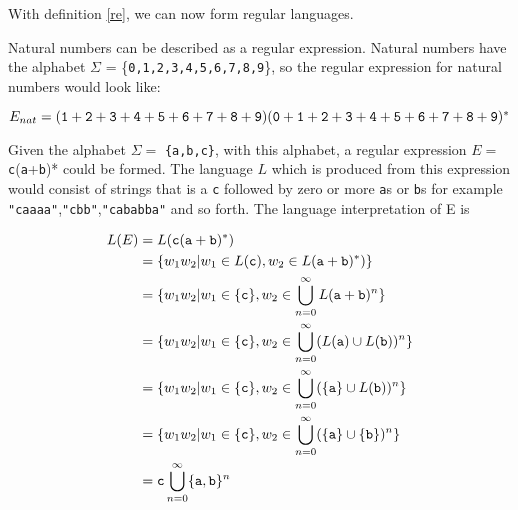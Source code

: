 With definition \ref{re}, we can now form regular languages. 
\begin{myex}Natural numbers can be described as a regular expression. Natural numbers have the alphabet $\Sigma$ = \{{\tt 0,1,2,3,4,5,6,7,8,9}\}, so the regular expression for natural numbers would look like:
\begin{center}
$E_{nat} = ({\tt 1}+{\tt 2}+{\tt 3}+{\tt 4}+{\tt 5}+{\tt 6}+{\tt 7}+{\tt 8}+{\tt 9})({\tt 0}+{\tt 1}+{\tt 2}+{\tt 3}+{\tt 4}+{\tt 5}+{\tt 6}+{\tt 7}+{\tt 8}+{\tt 9})^*$
\end{center}
\end{myex}

\begin{myex}
Given the alphabet $\Sigma =$ {\tt\{a,b,c\}}, with this alphabet, a regular expression $E =$ {\tt c}({\tt a}+{\tt b})* could be formed. The language $L$ which is produced from this expression would consist of strings that is a {\tt c} followed by zero or more {\tt a}s or {\tt b}s for example {\tt "caaaa"},{\tt "cbb"},{\tt "cababba"} and so forth. The language interpretation of E is 
\begin{center}
\begin{align*}
L(E) &= L({\tt c}({\tt a}+{\tt b})^*)\\
	 &= \{w_1 w_2|w_1 \in L({\tt c}),w_2 \in L({\tt a}+{\tt b})^*)\}\\
	 &= \{w_1 w_2|w_1 \in \{{\tt c}\}, w_2 \in \bigcup\limits_{n=0}^\infty L({\tt a}+{\tt b})^n \}\\
	 &= \{w_1 w_2|w_1 \in \{{\tt c}\}, w_2 \in \bigcup\limits_{n=0}^\infty (L({\tt a}) \cup L({\tt b}))^n \}\\
	 &= \{w_1 w_2|w_1 \in \{{\tt c}\}, w_2 \in \bigcup\limits_{n=0}^\infty (\{{\tt a}\} \cup L({\tt b}))^n \}\\
	 &= \{w_1 w_2|w_1 \in \{{\tt c}\}, w_2 \in \bigcup\limits_{n=0}^\infty (\{{\tt a}\} \cup \{{\tt b}\})^n \}\\
	 &= {\tt c} \bigcup\limits_{n=0}^\infty \{{\tt a,b}\}^n 
\end{align*}
\end{center}
\label{reinter}
\end{myex}